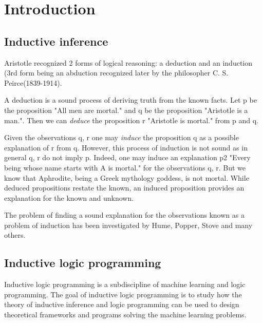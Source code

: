 
\chapter{Introduction}


\section{Inductive inference}
Aristotle recognized 2 forms of logical reasoning: a deduction and an induction\cite{sep-aristotle-logic} (3rd form being an abduction recognized later by the philosopher C. S. Peirce(1839-1914)\cite{kimber2012learning}\cite{peirce1935collected}.

A deduction is a sound process of deriving truth from the known facts. Let p be the proposition "All men are mortal." and q be the proposition "Aristotle is a man.". Then we can \emph{deduce} the proposition r "Aristotle is mortal." from p and q.

Given the observations q, r one may \emph{induce} the proposition q as a possible explanation of r from q. However, this process of induction is not sound as in general q, r do not imply p. Indeed, one may induce an explanation p2 "Every being whose name starts with A is mortal." for the observations q, r. But we know that Aphrodite, being a Greek mythology goddess, is not mortal. While  deduced propositions restate the known, an induced proposition provides an explanation for the known and unknown.

The problem of finding a sound explanation for the observations known as a problem of induction has been investigated by Hume\cite{hume1902enquiries}\cite{selby1888treatise}, Popper\cite{keuth2013karl}, Stove\cite{stove1986rationality} and many others.

\section{Inductive logic programming}\cite{muggleton1995inverse}\cite{nienhuys1997foundations}
Inductive logic programming is a subdiscipline of machine learning and logic programming. The goal of inductive logic programming is to study how the theory of inductive inference and logic programming can be used to design theoretical frameworks and programs solving the machine learning problems.

